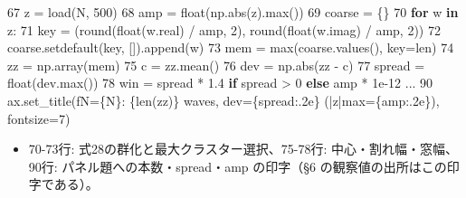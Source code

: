 \documentclass[
  a4paper,
]{ltjsarticle}
\newenvironment{Shaded}{}{}
\newcommand{\BuiltInTok}[1]{\textcolor[rgb]{0.00,0.50,0.00}{#1}}
\newcommand{\ControlFlowTok}[1]{\textcolor[rgb]{0.00,0.44,0.13}{\textbf{#1}}}
\newcommand{\DecValTok}[1]{\textcolor[rgb]{0.25,0.63,0.44}{#1}}
\newcommand{\FloatTok}[1]{\textcolor[rgb]{0.25,0.63,0.44}{#1}}
\newcommand{\KeywordTok}[1]{\textcolor[rgb]{0.00,0.44,0.13}{\textbf{#1}}}
\newcommand{\NormalTok}[1]{#1}
\newcommand{\OperatorTok}[1]{\textcolor[rgb]{0.40,0.40,0.40}{#1}}
\newcommand{\SpecialCharTok}[1]{\textcolor[rgb]{0.25,0.44,0.63}{#1}}
\newcommand{\SpecialStringTok}[1]{\textcolor[rgb]{0.73,0.40,0.53}{#1}}
\providecommand{\tightlist}{%
  \setlength{\itemsep}{0pt}\setlength{\parskip}{0pt}}
\begin{document}
\begin{Shaded}
\begin{Highlighting}[]
    \DecValTok{67}\NormalTok{      z }\OperatorTok{=}\NormalTok{ load(N, }\DecValTok{500}\NormalTok{)}
    \DecValTok{68}\NormalTok{      amp }\OperatorTok{=} \BuiltInTok{float}\NormalTok{(np.}\BuiltInTok{abs}\NormalTok{(z).}\BuiltInTok{max}\NormalTok{())}
    \DecValTok{69}\NormalTok{      coarse }\OperatorTok{=}\NormalTok{ \{\}}
    \DecValTok{70}      \ControlFlowTok{for}\NormalTok{ w }\KeywordTok{in}\NormalTok{ z:}
    \DecValTok{71}\NormalTok{          key }\OperatorTok{=}\NormalTok{ (}\BuiltInTok{round}\NormalTok{(}\BuiltInTok{float}\NormalTok{(w.real) }\OperatorTok{/}\NormalTok{ amp, }\DecValTok{2}\NormalTok{), }\BuiltInTok{round}\NormalTok{(}\BuiltInTok{float}\NormalTok{(w.imag) }\OperatorTok{/}\NormalTok{ amp, }\DecValTok{2}\NormalTok{))}
    \DecValTok{72}\NormalTok{          coarse.setdefault(key, []).append(w)}
    \DecValTok{73}\NormalTok{      mem }\OperatorTok{=} \BuiltInTok{max}\NormalTok{(coarse.values(), key}\OperatorTok{=}\BuiltInTok{len}\NormalTok{)}
    \DecValTok{74}\NormalTok{      zz }\OperatorTok{=}\NormalTok{ np.array(mem)}
    \DecValTok{75}\NormalTok{      c }\OperatorTok{=}\NormalTok{ zz.mean()}
    \DecValTok{76}\NormalTok{      dev }\OperatorTok{=}\NormalTok{ np.}\BuiltInTok{abs}\NormalTok{(zz }\OperatorTok{{-}}\NormalTok{ c)}
    \DecValTok{77}\NormalTok{      spread }\OperatorTok{=} \BuiltInTok{float}\NormalTok{(dev.}\BuiltInTok{max}\NormalTok{())}
    \DecValTok{78}\NormalTok{      win }\OperatorTok{=}\NormalTok{ spread }\OperatorTok{*} \FloatTok{1.4} \ControlFlowTok{if}\NormalTok{ spread }\OperatorTok{\textgreater{}} \DecValTok{0} \ControlFlowTok{else}\NormalTok{ amp }\OperatorTok{*} \FloatTok{1e{-}12}
\NormalTok{...}
    \DecValTok{90}\NormalTok{      ax.set\_title(}\SpecialStringTok{f\textquotesingle{}N=}\SpecialCharTok{\{}\NormalTok{N}\SpecialCharTok{\}}\SpecialStringTok{: }\SpecialCharTok{\{}\BuiltInTok{len}\NormalTok{(zz)}\SpecialCharTok{\}}\SpecialStringTok{ waves, dev=}\SpecialCharTok{\{}\NormalTok{spread}\SpecialCharTok{:.2e\}}\SpecialStringTok{ (|z|max=}\SpecialCharTok{\{}\NormalTok{amp}\SpecialCharTok{:.2e\}}\SpecialStringTok{)\textquotesingle{}}\NormalTok{, fontsize}\OperatorTok{=}\DecValTok{7}\NormalTok{)}
\end{Highlighting}
\end{Shaded}

\begin{itemize}
\tightlist
\item
  70-73行: 式28の群化と最大クラスター選択、75-78行: 中心・割れ幅・窓幅、
  90行: パネル題への本数・spread・amp の印字（§6
  の観察値の出所はこの印字である）。
\end{itemize}
\end{document}
